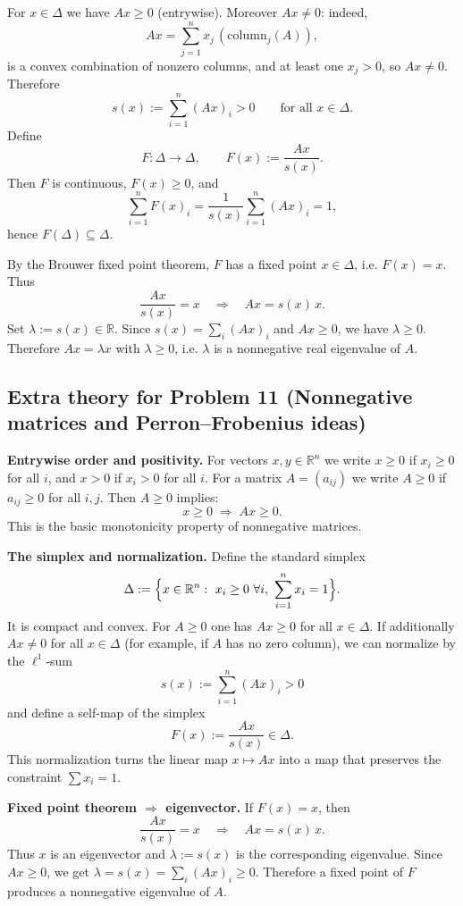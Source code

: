 \documentclass[12pt,a4paper]{article}
\theoremstyle{plain}
\theoremstyle{definition}      %
\begin{document}
For $x\in\Delta$ we have $Ax\ge 0$ (entrywise). Moreover $Ax\neq 0$:
indeed,
\[
Ax=\sum_{j=1}^n x_j\,(\text{column}_j(A)),
\]
is a convex combination of nonzero columns, and at least one $x_j>0$, so $Ax\neq 0$.
Therefore
\[
s(x):=\sum_{i=1}^n (Ax)_i >0 \qquad \text{for all } x\in\Delta.
\]
Define
\[
F:\Delta\to \Delta,\qquad F(x):=\frac{Ax}{s(x)}.
\]
Then $F$ is continuous, $F(x)\ge 0$, and
\[
\sum_{i=1}^n F(x)_i = \frac{1}{s(x)}\sum_{i=1}^n (Ax)_i = 1,
\]
hence $F(\Delta)\subseteq \Delta$.

By the Brouwer fixed point theorem, $F$ has a fixed point $x\in\Delta$, i.e. $F(x)=x$.
Thus
\[
\frac{Ax}{s(x)}=x \quad\Longrightarrow\quad Ax=s(x)\,x.
\]
Set $\lambda:=s(x)\in\mathbb{R}$. Since $s(x)=\sum_i (Ax)_i$ and $Ax\ge 0$, we have $\lambda\ge 0$.
Therefore $Ax=\lambda x$ with $\lambda\ge 0$, i.e. $\lambda$ is a nonnegative real eigenvalue of $A$.

\subsection*{Extra theory for Problem 11 (Nonnegative matrices and Perron--Frobenius ideas)}

\noindent\textbf{Entrywise order and positivity.}
For vectors $x,y\in\mathbb{R}^n$ we write $x\ge 0$ if $x_i\ge 0$ for all $i$, and $x>0$ if $x_i>0$ for all $i$.
For a matrix $A=(a_{ij})$ we write $A\ge 0$ if $a_{ij}\ge 0$ for all $i,j$.
Then $A\ge 0$ implies:
\[
x\ge 0 \;\Longrightarrow\; Ax\ge 0.
\]
This is the basic monotonicity property of nonnegative matrices.

\medskip
\noindent\textbf{The simplex and normalization.}
Define the standard simplex
\[
\Delta:=\Bigl\{x\in\mathbb{R}^n:\ x_i\ge 0\ \forall i,\ \sum_{i=1}^n x_i=1\Bigr\}.
\]
It is compact and convex. For $A\ge 0$ one has $Ax\ge 0$ for all $x\in\Delta$.
If additionally $Ax\neq 0$ for all $x\in\Delta$ (for example, if $A$ has no zero column),
we can normalize by the $\ell^1$-sum
\[
s(x):=\sum_{i=1}^n (Ax)_i>0
\]
and define a self-map of the simplex
\[
F(x):=\frac{Ax}{s(x)}\in \Delta.
\]
This normalization turns the linear map $x\mapsto Ax$ into a map that preserves the constraint $\sum x_i=1$.

\medskip
\noindent\textbf{Fixed point theorem $\Rightarrow$ eigenvector.}
If $F(x)=x$, then
\[
\frac{Ax}{s(x)}=x \quad\Longrightarrow\quad Ax=s(x)\,x.
\]
Thus $x$ is an eigenvector and $\lambda:=s(x)$ is the corresponding eigenvalue.
Since $Ax\ge 0$, we get $\lambda=s(x)=\sum_i (Ax)_i\ge 0$.
Therefore a fixed point of $F$ produces a nonnegative eigenvalue of $A$.
\end{document}
